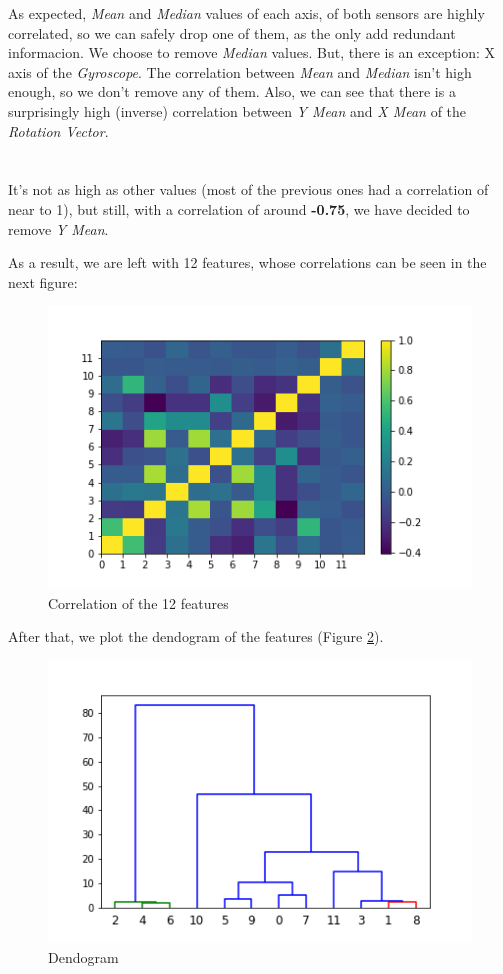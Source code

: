 \documentclass[idxtotoc,hyperref,openany]{labbook} %
\begin{document}
As expected, \textit{Mean} and \textit{Median} values of each axis, of both sensors are highly correlated, so we can safely drop one of them, as the only add redundant informacion. We choose to remove \textit{Median} values. But, there is an exception: X axis of the \textit{Gyroscope}. The correlation between \textit{Mean} and \textit{Median} isn't high enough, so we don't remove any of them.
Also, we can see that there is a surprisingly high (inverse) correlation between \textit{Y Mean} and \textit{X Mean} of the \textit{Rotation Vector}.\\\\\\
It's not as high as other values (most of the previous ones had a correlation of near to 1), but still, with a correlation of around \textbf{-0.75}, we have decided to remove \textit{Y Mean}.

As a result, we are left with 12 features, whose correlations can be seen in the next figure:

\begin{figure}[h]
\includegraphics[width=0.9\linewidth]{2710/Features_CorrelationMatrix_postDrop.png}
\setlength\belowcaptionskip{-10pt}
\caption{Correlation of the 12 features}
\label{Correlation Postdrop Gyroscope}
\end{figure}

\clearpage
After that, we plot the dendogram of the features (Figure \ref{Dendogram Gyroscope}).

\begin{figure}[h]
\includegraphics[width=0.9\linewidth]{2710/Features_Dendogram.png}
\setlength\belowcaptionskip{-10pt}
\caption{Dendogram}
\label{Dendogram Gyroscope}
\end{figure}
\end{document}
